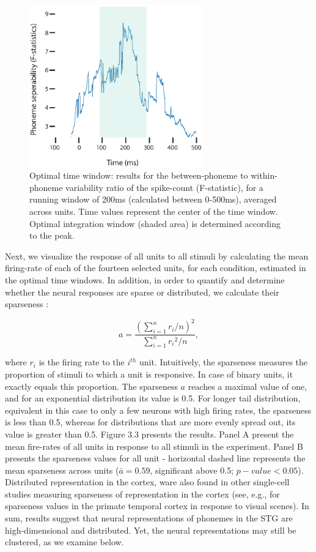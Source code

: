 \begin{figure}
\vspace{.3in}

\includegraphics[width=\linewidth, height=7cm]{Figures/Ch3/Figure1_new.eps}
\caption{Optimal time window: results for the between-phoneme to within-phoneme variability ratio of the spike-count (F-statistic), for a running window of 200ms (calculated between 0-500ms), averaged across units. Time values represent the center of the time window. Optimal integration window (shaded area) is determined according to the peak.}
\end{figure}

Next, we visualize the response of all units to all stimuli by calculating the mean firing-rate of each of the fourteen selected units, for each condition, estimated in the optimal time windows. In addition, in order to quantify and determine whether the neural responses are sparse or distributed, we calculate their sparseness \citep{treves1991determines}:

\begin{equation}
    a = \frac{(\sum_{i=1}^n{r_i/n})^2}{\sum_{i=1}^n{{r_i}^2/n}},
\end{equation}

where $r_i$ is the firing rate to the $i^{th}$ unit. Intuitively, the sparseness measures the proportion of stimuli to which a unit is responsive. In case of binary units, it exactly equals this proportion. The sparseness $a$ reaches a maximal value of one, and for an exponential distribution its value is 0.5. For longer tail distribution, equivalent in this case to only a few neurons with high firing rates, the sparseness is less than 0.5, whereas for distributions that are more evenly spread out, its value is greater than 0.5. Figure 3.3 presents the results. Panel A present the mean fire-rates of all units in response to all stimuli in the experiment. Panel B presents the sparseness values for all unit - horizontal dashed line represents the mean sparseness across units ($\bar{a}=0.59$, significant above 0.5; $p-value < 0.05$). Distributed representation in the cortex, ware also found in other single-cell studies measuring sparseness of representation in the cortex (see, e.g., \citealp{rolls1995sparseness} for sparseness values in the primate temporal cortex in response to visual scenes). In sum, results suggest that neural representations of phonemes in the STG are high-dimensional and distributed. Yet, the neural representations may still be clustered, as we examine below.

